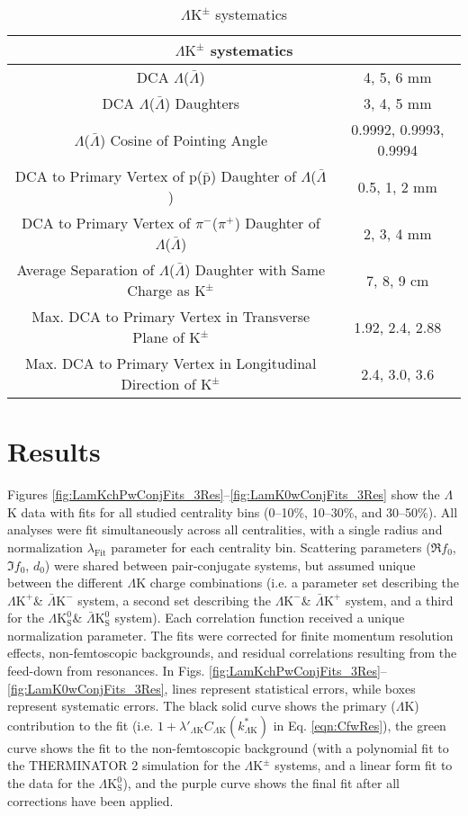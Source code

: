 \documentclass[ALICE,manyauthors]{cernphprep}
\newcommand{\LamALam}{$\Lambda$($\bar{\Lambda}$)\xspace}
\newcommand{\Kpm}{$\mathrm{K^{\pm}}$\xspace}
\newcommand{\LamK}{$\Lambda$K\xspace}
\newcommand{\LamKchP}{$\Lambda\mathrm{K^{+}}$\xspace}
\newcommand{\ALamKchM}{$\bar{\Lambda}\mathrm{K^{-}}$\xspace}
\newcommand{\LamKchM}{$\Lambda\mathrm{K^{-}}$\xspace}
\newcommand{\ALamKchP}{$\bar{\Lambda}\mathrm{K^{+}}$\xspace}
\newcommand{\LamKpm}{$\Lambda\mathrm{K^{\pm}}$\xspace}
\newcommand{\LamKs}{$\Lambda\mathrm{K^{0}_{S}}$\xspace}
\newcommand{\ALamKs}{$\bar{\Lambda}\mathrm{K^{0}_{S}}$\xspace}
\begin{document}
\begin{table}[htbp]
 \centering 
  \renewcommand{\arraystretch}{1.2}
  \begin{tabular}{c|c}
   \multicolumn{2}{c}{\LamKpm systematics} \\
   \hline  
   DCA \LamALam & 4, 5, 6 mm \\
   \hline
   DCA \LamALam Daughters & 3, 4, 5 mm \\
   \hline
   \LamALam Cosine of Pointing Angle & 0.9992, 0.9993, 0.9994 \\
   \hline
   DCA to Primary Vertex of p($\bar{\mathrm{p}}$) Daughter of \LamALam &  0.5, 1, 2 mm \\
   \hline
   DCA to Primary Vertex of $\pi^{-}$($\pi^{+}$) Daughter of \LamALam &  2, 3, 4 mm  \\
   \hline
   Average Separation of \LamALam Daughter with Same Charge as \Kpm & 7, 8, 9 cm \\
   \hline
   Max. DCA to Primary Vertex in Transverse Plane of \Kpm & 1.92, 2.4, 2.88 \\
   \hline
   Max. DCA to Primary Vertex in Longitudinal Direction of \Kpm & 2.4, 3.0, 3.6 \\
   \hline
  \end{tabular}
 \caption{\LamKpm systematics}
 \label{tab:LamKchSystematics} 
\end{table}



\section{Results}
\label{sec:Results}

Figures \ref{fig:LamKchPwConjFits_3Res}--\ref{fig:LamK0wConjFits_3Res} show the \LamK data with fits for all studied centrality bins (0--10\%, 10--30\%, and 30--50\%). 
All analyses were fit simultaneously across all centralities, with a single radius and normalization $\lambda_{\mathrm{Fit}}$ parameter for each centrality bin.
Scattering parameters ($\Re f_{0}$, $\Im f_{0}$, $d_{0}$) were shared between pair-conjugate systems, but assumed unique between the different \LamK charge combinations (i.e. a parameter set describing the \LamKchP \& \ALamKchM system, a second set describing the \LamKchM \& \ALamKchP system, and a third for the \LamKs \& \ALamKs system).
Each correlation function received a unique normalization parameter.
The fits were corrected for finite momentum resolution effects, non-femtoscopic backgrounds, and residual correlations resulting from the feed-down from resonances.
In Figs. \ref{fig:LamKchPwConjFits_3Res}--\ref{fig:LamK0wConjFits_3Res}, lines represent statistical errors, while boxes represent systematic errors.  
The black solid curve shows the primary (\LamK) contribution to the fit (i.e. $1 + \lambda'_{\Lambda\mathrm{K}}C_{\Lambda\mathrm{K}}(k^{*}_{\Lambda\mathrm{K}})$ in Eq. \ref{eqn:CfwRes}), the green curve shows the fit to the non-femtoscopic background (with a polynomial fit to the THERMINATOR 2 simulation for the \LamKpm systems, and a linear form fit to the data for the \LamKs), and the purple curve shows the final fit after all corrections have been applied.
\end{document}
